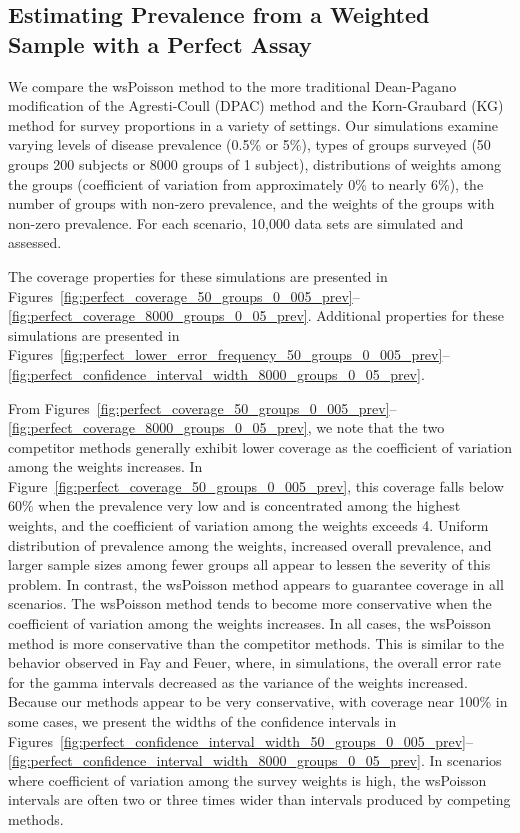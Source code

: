 \documentclass[AMA,STIX1COL]{WileyNJD-v2}
\begin{document}
\subsection{Estimating Prevalence from a Weighted Sample with a Perfect Assay}

We compare the wsPoisson method to the more traditional Dean-Pagano modification of the Agresti-Coull (DPAC) method and the Korn-Graubard (KG) method for survey proportions in a variety of settings.
Our simulations examine varying levels of disease prevalence (0.5\% or 5\%), types of groups surveyed (50 groups 200 subjects or 8000 groups of 1 subject), distributions of weights among the groups (coefficient of variation from approximately 0\% to nearly 6\%), the number of groups with non-zero prevalence, and the weights of the groups with non-zero prevalence.
For each scenario, 10,000 data sets are simulated and assessed.

The coverage properties for these simulations are presented in Figures~\ref{fig:perfect_coverage_50_groups_0_005_prev}--\ref{fig:perfect_coverage_8000_groups_0_05_prev}.
Additional properties for these simulations are presented in Figures~\ref{fig:perfect_lower_error_frequency_50_groups_0_005_prev}--\ref{fig:perfect_confidence_interval_width_8000_groups_0_05_prev}.

From Figures~\ref{fig:perfect_coverage_50_groups_0_005_prev}--\ref{fig:perfect_coverage_8000_groups_0_05_prev}, we note that the two competitor methods generally exhibit lower coverage as the coefficient of variation among the weights increases.
In Figure~\ref{fig:perfect_coverage_50_groups_0_005_prev}, this coverage falls below 60\% when the prevalence very low and is concentrated among the highest weights, and the coefficient of variation among the weights exceeds 4.
Uniform distribution of prevalence among the weights, increased overall prevalence, and larger sample sizes among fewer groups all appear to lessen the severity of this problem.
In contrast, the wsPoisson method appears to guarantee coverage in all scenarios. The wsPoisson method tends to become more conservative when the coefficient of variation among the weights increases. 
In all cases, the wsPoisson method is more conservative than the competitor methods.
This is similar to the behavior observed in Fay and Feuer\cite{FayF:1997}, where, in simulations, the overall error rate for the gamma intervals decreased as the variance of the weights increased.
Because our methods appear to be very conservative, with coverage near 100\% in some cases, we present the widths of the confidence intervals in Figures~\ref{fig:perfect_confidence_interval_width_50_groups_0_005_prev}--\ref{fig:perfect_confidence_interval_width_8000_groups_0_05_prev}.
In scenarios where coefficient of variation among the survey weights is high, the wsPoisson intervals are often two or three times wider than intervals produced by competing methods.
\end{document}
